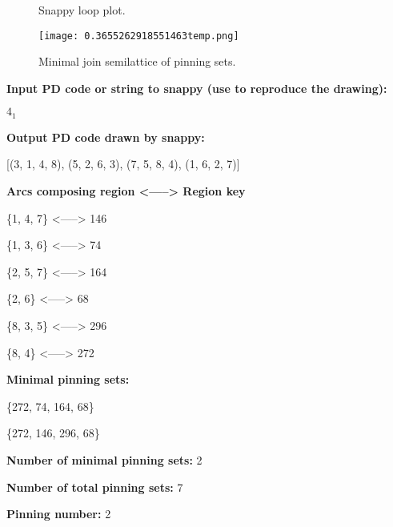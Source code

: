 \documentclass{article}%
\begin{document}
\begin{multicols}{2}
\begin{figure}[H]
\centering

\caption{Snappy loop plot.}
\label{fig:0.03246267004202574temp.svg}
\end{figure}\columnbreak

\begin{figure}[H]
\centering
\texttt{[image: 0.3655262918551463temp.png]}
\caption{Minimal join semilattice of pinning sets.}
\label{fig:0.3655262918551463temp.png}
\end{figure}\end{multicols}\newpage\begin{multicols}{2}
\textbf{Input PD code or string to snappy (use to reproduce the drawing):}

	$4_1$

\textbf{Output PD code drawn by snappy:}

	[(3, 1, 4, 8), (5, 2, 6, 3), (7, 5, 8, 4), (1, 6, 2, 7)]


\textbf{Arcs composing region <-----> Region key}

\{{1, 4, 7}\} <-----> 146

\{{1, 3, 6}\} <-----> 74

\{{2, 5, 7}\} <-----> 164

\{{2, 6}\} <-----> 68

\{{8, 3, 5}\} <-----> 296

\{{8, 4}\} <-----> 272


\columnbreak

\textbf{Minimal pinning sets:}

\{{272, 74, 164, 68}\}

\{{272, 146, 296, 68}\}



\textbf{Number of minimal pinning sets:} 2

\textbf{Number of total pinning sets:} 7

\textbf{Pinning number:} 2


\end{multicols}
\end{document}
